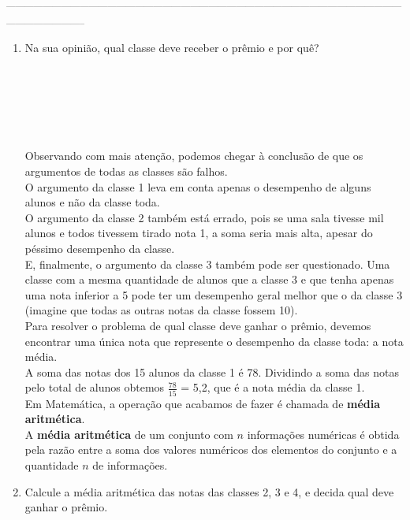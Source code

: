 \documentclass[a4paper,14pt]{article}
\begin{document}
	\noindent\textsubscript{-----------------------------------------------------------------------------------------------------------------------------------------------------------}
	\begin{multicols}{2}
		\begin{enumerate} 
			\item Na sua opinião, qual classe deve receber o prêmio e por quê? \\\\\\\\\\\\\\
			Observando com mais atenção, podemos chegar à conclusão de que os argumentos de todas as classes são falhos. \\
			O argumento da classe 1 leva em conta apenas o desempenho de alguns alunos e não da classe toda. \\
			O argumento da classe 2 também está errado, pois se uma sala tivesse mil alunos e todos tivessem tirado nota 1, a soma seria mais alta, apesar do péssimo desempenho da classe. \\
			E, finalmente, o argumento da classe 3 também pode ser questionado. Uma classe com a mesma quantidade de alunos que a classe 3 e que tenha apenas uma nota inferior a 5 pode ter um desempenho geral melhor que o da classe 3 (imagine que todas as outras notas da classe fossem 10). \\
			Para resolver o problema de qual classe deve ganhar o prêmio, devemos encontrar uma única nota que represente o desempenho da classe toda: a nota média. \\
			A soma das notas dos 15 alunos da classe 1 é 78. Dividindo a soma das notas pelo total de alunos obtemos $\frac{78}{15}$ = 5,2, que é a nota média da classe 1. \\
			Em Matemática, a operação que acabamos de fazer é chamada de \textbf{média aritmética}. \\
			A \textbf{média aritmética} de um conjunto com $n$ informações numéricas é obtida pela razão entre a soma dos valores numéricos dos elementos do conjunto e a quantidade $n$ de informações.
			\item Calcule a média aritmética das notas das classes 2, 3 e 4, e decida qual deve ganhar o prêmio. \\\\\\\\\\\\\\\\\\\\\\\\\\

\end{enumerate}
\end{multicols}
\end{document}
